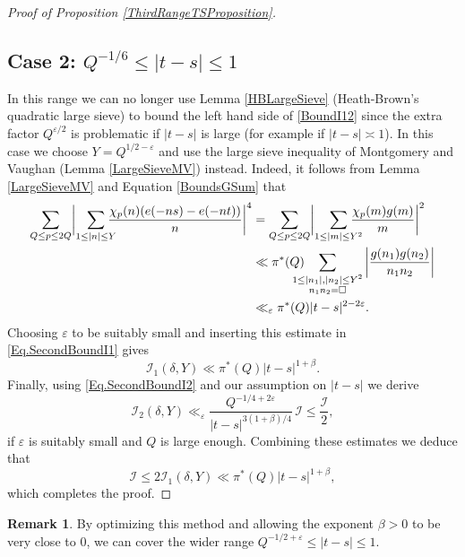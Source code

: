 \documentclass[JEP,XML,SOM,Unicode,NoFloatCountersInSection,published]{cedram}
\theoremstyle{plain}
\theoremstyle{definition}
\newtheorem{rem}[thm]{Remark}
\let\ep\varepsilon
\begin{document}
\begin{proof}[Proof of Proposition \ref{ThirdRangeTSProposition}]
\subsection*{Case 2: $Q^{-1/6}\leq|t-s|\leq 1$}
In this range we can no longer use Lemma \ref{HBLargeSieve} (Heath-Brown's quadratic large sieve) to bound the left hand side of \eqref{BoundI12} since the extra factor $Q^{\ep/2}$ is problematic if $|t-s|$ is large (for example if $|t-s|\asymp 1$). In this case we choose $Y= Q^{1/2-\ep}$ and use the large sieve inequality of Montgomery and Vaughan (Lemma \ref{LargeSieveMV}) instead. Indeed, it follows from Lemma \ref{LargeSieveMV} and Equation \eqref{BoundsGSum} that
\begin{equation}\label{BoundI13}
\begin{aligned}
\sum_{Q\leq p\leq 2Q} \biggl|\sum_{1\leq |n|\leq Y}\hspace*{-3mm} \frac{\chi_p(n) (e(-ns)-e(-nt))}{n} \biggl|^4
&= \sum_{Q\leq p\leq 2Q} \biggl|\sum_{1\leq |m|\leq Y^2}\hspace*{-4mm} \frac{\chi_p(m)g(m)}{m} \biggr|^2 \\
&\ll \pi^*(Q)\hspace*{-4mm} \sum_{\substack{1\leq |n_1|, |n_2|\leq Y^2\\ n_1n_2=\square}} \left|\frac{g(n_1)g(n_2)}{n_1n_2}\right| \\
&\ll_{\ep} \pi^*(Q)|t-s|^{2-2\ep}.
\end{aligned}
\end{equation}
Choosing $\ep$ to be suitably small and inserting this estimate in \eqref{Eq.SecondBoundI1} gives
\[
\mathcal{I}_1(\delta, Y) \ll \pi^{*}(Q)|t-s|^{1+\beta}. \]
Finally, using \eqref{Eq.SecondBoundI2} and our assumption on $|t-s|$ we derive
\[
\mathcal{I}_2(\delta, Y) \ll_{\ep} \frac{Q^{-1/4+2\ep}} {|t-s|^{3(1+\beta)/4}}\, \mathcal{I} \leq \frac{\mathcal{I}}{2}, \]
if $\ep$ is suitably small and $Q$ is large enough. Combining these estimates we deduce that
\[\mathcal{I}\leq 2 \mathcal{I}_1(\delta, Y) \ll \pi^{*}(Q)|t-s|^{1+\beta}, \]
which completes the proof.
\end{proof}

\begin{rem}\label{Rem.FinalRange}
By optimizing this method and allowing the exponent $\beta>0$ to be very close to $0$, we can cover the wider range $Q^{-1/2+\ep} \leq |t-s|\leq 1$.
\end{rem}

\backmatter


\end{document}
